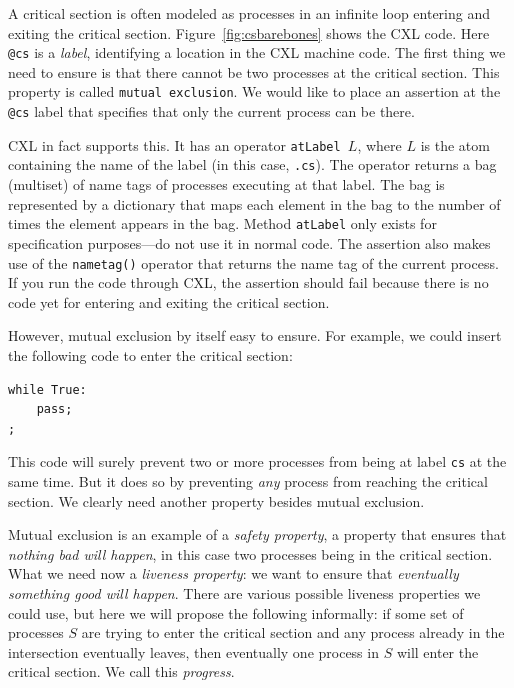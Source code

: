 \documentclass{report}
\newenvironment{code}{
\tcolorbox
}{
\endtcolorbox
}
\begin{document}
A critical section is often modeled as processes in an infinite loop
entering and exiting the critical section.
Figure~\ref{fig:csbarebones} shows the CXL code.
Here \texttt{@cs} is a \emph{label}, identifying
a location in the CXL machine code.  The first thing we need to
ensure is that there cannot be two processes at the critical section.
This property is called \texttt{mutual exclusion}.
We would like to place an assertion at the \texttt{@cs} label that
specifies that only the current process can be there.

CXL in fact supports this.
It has an operator \texttt{atLabel $L$}, where $L$
is the atom containing the name of the label (in this case, \texttt{.cs}).
The operator returns a bag (multiset) of name tags of processes executing at that
label.  The bag is represented by a dictionary that maps each element
in the bag to the number of times the element appears in the bag.
Method \texttt{atLabel} only exists for specification purposes---do not
use it in normal code.
The assertion also makes use of the \texttt{nametag()} operator that
returns the name tag of the current process.
If you run the code through CXL, the assertion should fail because
there is no code yet for entering and exiting the critical section.

However, mutual exclusion by itself easy to ensure.
For example, we could insert the following code to enter the
critical section:
\begin{code}
\begin{verbatim}
while True:
    pass;
;
\end{verbatim}
\end{code}
This code will surely prevent two or more processes from being
at label \texttt{cs} at the same time.
But it does so by preventing \emph{any} process from reaching
the critical section.
We clearly need another property besides mutual exclusion.

Mutual exclusion is an example of a \emph{safety property},
a property that ensures that \emph{nothing bad will happen}, in this case
two processes being in the critical section.
What we need now a \emph{liveness property}:
we want to ensure that
\emph{eventually something good will happen}.
There are various possible liveness properties we could use,
but here we will propose the following informally: if some set of processes
$S$ are trying to enter the critical section and any process already in the
intersection eventually leaves, then eventually one process in $S$ will enter
the critical section.
We call this \emph{progress}.
\end{document}
